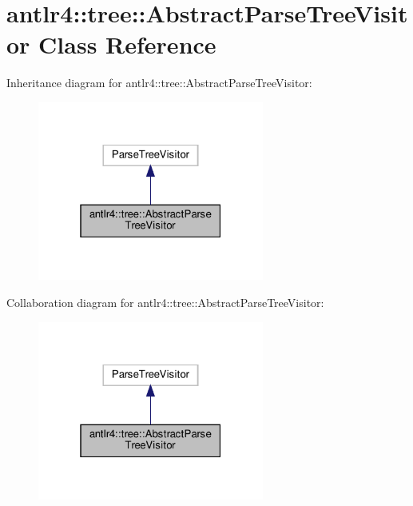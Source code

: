\hypertarget{classantlr4_1_1tree_1_1AbstractParseTreeVisitor}{}\section{antlr4\+:\+:tree\+:\+:Abstract\+Parse\+Tree\+Visitor Class Reference}
\label{classantlr4_1_1tree_1_1AbstractParseTreeVisitor}


Inheritance diagram for antlr4\+:\+:tree\+:\+:Abstract\+Parse\+Tree\+Visitor\+:
\nopagebreak
\begin{figure}[H]
\begin{center}
\leavevmode
\includegraphics[width=211pt]{classantlr4_1_1tree_1_1AbstractParseTreeVisitor__inherit__graph}
\end{center}
\end{figure}


Collaboration diagram for antlr4\+:\+:tree\+:\+:Abstract\+Parse\+Tree\+Visitor\+:
\nopagebreak
\begin{figure}[H]
\begin{center}
\leavevmode
\includegraphics[width=211pt]{classantlr4_1_1tree_1_1AbstractParseTreeVisitor__coll__graph}
\end{center}
\end{figure}
